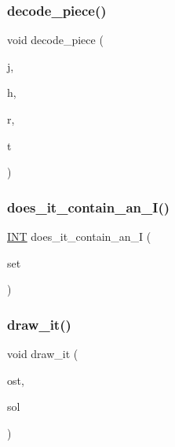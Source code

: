 \subsubsection{\texorpdfstring{decode\+\_\+piece()}{decode\_piece()}}
{\footnotesize\ttfamily void decode\+\_\+piece (\begin{DoxyParamCaption}\item[{\mbox{\hyperlink{galois_8h_a09fddde158a3a20bd2dcadb609de11dc}{I\+NT}}}]{j,  }\item[{\mbox{\hyperlink{galois_8h_a09fddde158a3a20bd2dcadb609de11dc}{I\+NT}} \&}]{h,  }\item[{\mbox{\hyperlink{galois_8h_a09fddde158a3a20bd2dcadb609de11dc}{I\+NT}} \&}]{r,  }\item[{\mbox{\hyperlink{galois_8h_a09fddde158a3a20bd2dcadb609de11dc}{I\+NT}} \&}]{t }\end{DoxyParamCaption})}

\mbox{\label{pentomino__5x5_8_c_a08b5deba2a500a6a05851783517854b9}} 
\subsubsection{\texorpdfstring{does\+\_\+it\+\_\+contain\+\_\+an\+\_\+\+I()}{does\_it\_contain\_an\_I()}}
{\footnotesize\ttfamily \mbox{\hyperlink{galois_8h_a09fddde158a3a20bd2dcadb609de11dc}{I\+NT}} does\+\_\+it\+\_\+contain\+\_\+an\+\_\+I (\begin{DoxyParamCaption}\item[{\mbox{\hyperlink{galois_8h_a09fddde158a3a20bd2dcadb609de11dc}{I\+NT}} $\ast$}]{set }\end{DoxyParamCaption})}

\mbox{\label{pentomino__5x5_8_c_aca3b0ec88a5b0c7ee4cec0b6b1c6e28b}} 
\subsubsection{\texorpdfstring{draw\+\_\+it()}{draw\_it()}}
{\footnotesize\ttfamily void draw\+\_\+it (\begin{DoxyParamCaption}\item[{ostream \&}]{ost,  }\item[{\mbox{\hyperlink{galois_8h_a09fddde158a3a20bd2dcadb609de11dc}{I\+NT}} $\ast$}]{sol }\end{DoxyParamCaption})}

